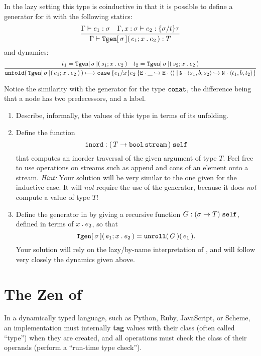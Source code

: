 \documentclass[11pt]{article}
\begin{document}
In the lazy setting this type is coinductive in that it is possible to define a generator for it with the following statics:
\[
  \infer
  {\Gamma\vdash\IsOf{\Tgenabt{\sigma}{e_1}{x}{e_2}}{T}}
  {\Gamma\vdash\IsOf{e_1}{\sigma}\quad \Gamma,\IsOfVar{x}{\sigma}\vdash\IsOf{e_2}{\Subst{\sigma}{t}{\tau}}}
\]
and dynamics:
\[
  \infer
  {\unfoldexcst{\Tgenabt{\sigma}{e_1}{x}{e_2}}\StepsTo
    \Tcaseexcst{\Subst{e_1}{x}{e_2}}{\fld{\Elbl}{\unitexcst}}{s_1}{b}{s_2}{\fld{\Nlbl}{\tripexcst{t_1}{b}{t_2}}}}
  {t_1=\Tgenabt{\sigma}{s_1}{x}{e_2}\quad t_2=\Tgenabt{\sigma}{s_2}{x}{e_2}}
\]
Notice the similarity with the generator for the type $\mathtt{conat}$, the difference being that a node has two predecessors, and a label.

\begin{enumerate}
  \item Describe, informally, the values of this type in terms of its unfolding.
  \item Define the function
  \[
    \mathtt{inord}:{\mathtt{(}\,{T}\mathrel{\to}{\mathtt{bool}\,\mathtt{stream}}\,\mathtt{)}}\;{\mathtt{self}}
  \]
  that computes an inorder traversal of the given argument of type $T$.
  Feel free to use operations on streams such as append and cons of an element onto a stream.  \emph{Hint:} Your solution will be very similar to the one given for the inductive case.  It will \emph{not} require the use of the generator, because it does \emph{not} compute a value of type $T$!
  \item Define the generator in \LangFPC{} by giving a recursive function $G:{(\sigma\to T)}\;{\mathtt{self}}$, defined in terms of ${x}\mathbin{\mathtt{.}}{e_2}$, so that
    \[
      {\mathtt{Tgen}}\mathtt{[}\,{\sigma}\,\mathtt{]}\mathtt{(}\,e_1; {x}\mathbin{\mathtt{.}}{e_2}\,\mathtt{)} = {{\mathtt{unroll}}\mathtt{(}\,G\,\mathtt{)}}\mathtt{(}\,e_1\,\mathtt{)}.
    \]
  Your solution will rely on the lazy/by-name interpretation of \LangFPC, and will follow very closely the dynamics given above.
\end{enumerate}




\section{The Zen of \LangPyCF{}}

In a dynamically typed language, such as Python, Ruby, JavaScript, or Scheme,
an implementation must internally \textbf{tag} values with their class (often called ``type'') when they are created,
and all operations must check the class of their operands (perform a ``run-time type check'').
\end{document}
